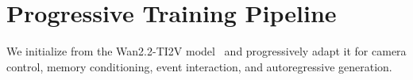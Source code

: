 \section{Progressive Training Pipeline}

We initialize \method{} from the Wan2.2-TI2V model~\citep{wan2025wan} and progressively adapt it for camera control, memory conditioning, event interaction, and autoregressive generation.



\FloatBarrier






\FloatBarrier


